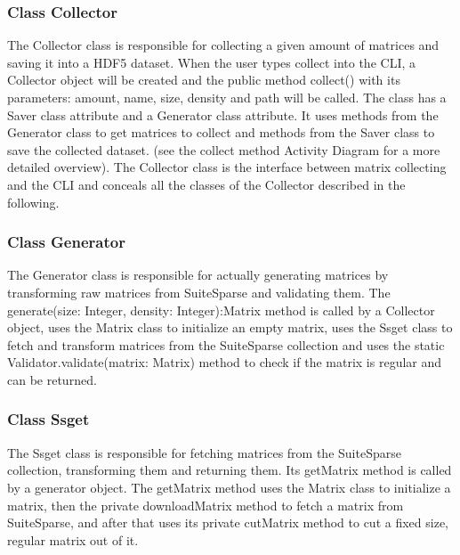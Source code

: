 \documentclass[parskip=full]{scrartcl}
\begin{document}
\subsubsection{Class Collector}
The Collector class is responsible for collecting a given amount of matrices and saving it into a HDF5 dataset.
When the user types collect into the CLI, a Collector object will be created and the public method collect() with its parameters:
amount, name, size, density and path
will be called. 
The class has a Saver class attribute and a Generator class attribute.
It uses methods from the Generator class to get matrices to collect and methods from the Saver class to save the collected dataset.
(see the collect method Activity Diagram for a more detailed overview).
The Collector class is the interface between matrix collecting and the CLI and conceals all the classes of the Collector described in the following.

\subsubsection{Class Generator}
The Generator class is responsible for actually generating matrices by transforming raw matrices from SuiteSparse and validating them.
The generate(size: Integer, density: Integer):Matrix method is called by a Collector object, uses the Matrix class to initialize an empty matrix, uses the Ssget class to fetch and transform matrices from the SuiteSparse collection and uses the static Validator.validate(matrix: Matrix)  method to check if the matrix is regular and can be returned.

\subsubsection{Class Ssget}
The Ssget class is responsible for fetching matrices from the SuiteSparse collection, transforming them and returning them.
Its getMatrix method is called by a generator object.
The getMatrix method uses the Matrix class to initialize a matrix, then the private downloadMatrix method to fetch a matrix from SuiteSparse, and after that uses its private cutMatrix method to cut a fixed size, regular matrix out of it.
\end{document}

